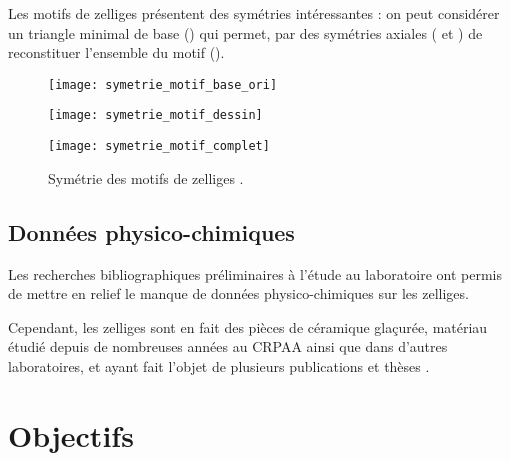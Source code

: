 Les motifs de zelliges présentent des symétries intéressantes : on 
peut considérer un triangle minimal de base () 
qui permet, par des symétries axiales ( et 
) de reconstituer l'ensemble du motif 
().


\begin{figure}[htb]
  \begin{minipage}[b]{0.45\textwidth}
    \centerfloat
    \texttt{[image: symetrie\_motif\_base\_ori]}
  \end{minipage}%

  \bigskip

  \begin{minipage}[b]{0.45\textwidth}
    \centerfloat
    \texttt{[image: symetrie\_motif\_dessin]}
  \end{minipage}%
  \quad
  \begin{minipage}[b]{0.45\textwidth}
    \centerfloat
    \texttt{[image: symetrie\_motif\_complet]}
  \end{minipage}
  \caption{Symétrie des motifs de zelliges \autocite{Castera_1996}.}
  \label{fig:symetrie}
\end{figure}

\section{Données physico-chimiques}

Les recherches bibliographiques préliminaires à l'étude au laboratoire 
ont permis de mettre en relief le manque de données physico-chimiques 
sur les zelliges.

Cependant, les zelliges sont en fait des pièces de céramique glaçurée, 
matériau étudié depuis de nombreuses années au CRPAA ainsi que dans 
d'autres laboratoires, et ayant fait l'objet de plusieurs publications 
\autocites{Delvert_1991}{Schvoerer_1994} et thèses 
\autocite{Rafaillac_1994}.

\chapter{Objectifs}

